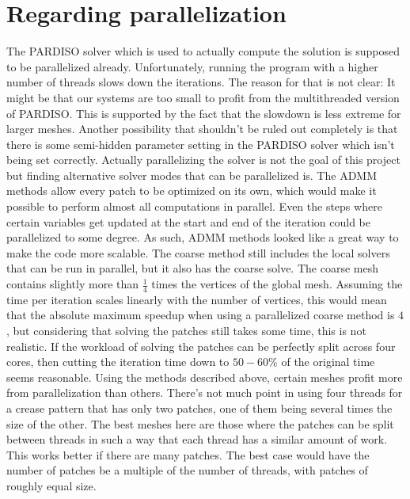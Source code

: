\documentclass[a4paper,twoside,12pt,nochapterprefix]{scrbook}
\begin{document}
\chapter{Regarding parallelization}\label{sec:parallelization}
The PARDISO solver which is used to actually compute the solution is supposed to be parallelized already. Unfortunately, running the program with a higher number of threads slows down the iterations. The reason for that is not clear: It might be that our systems are too small to profit from the multithreaded version of PARDISO. This is supported by the fact that the slowdown is less extreme for larger meshes. %
Another possibility that shouldn't be ruled out completely is that there is some semi-hidden parameter setting in the PARDISO solver which isn't being set correctly.\newline
Actually parallelizing the solver is not the goal of this project but finding alternative solver modes that can be parallelized is. The ADMM methods allow every patch to be optimized on its own, which would make it possible to perform almost all computations in parallel. Even the steps where certain variables get updated at the start and end of the iteration could be parallelized to some degree. As such, ADMM methods looked like a great way to make the code more scalable.\newline
The coarse method still includes the local solvers that can be run in parallel, but it also has the coarse solve. The coarse mesh contains slightly more than $\frac{1}{4}$ times the vertices of the global mesh. Assuming the time per iteration scales linearly with the number of vertices, this would mean that the absolute maximum speedup when using a parallelized coarse method is $4$, but considering that solving the patches still takes some time, this is not realistic. If the workload of solving the patches can be perfectly split across four cores, then cutting the iteration time down to $50 - 60 \%$ of the original time seems reasonable.\newline
Using the methods described above, certain meshes profit more from parallelization than others. %
There's not much point in using four threads for a crease pattern that has only two patches, one of them being several times the size of the other. The best meshes here are those where the patches can be split between threads in such a way that each thread has a similar amount of work. This works better if there are many patches. The best case would have the number of patches be a multiple of the number of threads, with patches of roughly equal size.\newline
\end{document}
